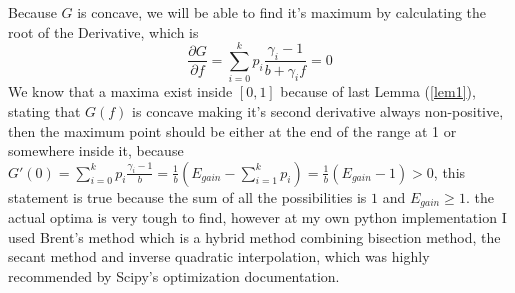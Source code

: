 \documentclass{article}
\newcommand{\pdiv}[2]{{\frac{\partial#1}{\partial#2}}}
\begin{document}
	Because $G$ is concave, we will be able to find it's maximum by calculating the root of the Derivative, which is 
	\[\pdiv{G}{f} = \sum_{i=0}^{k} p_i \frac{\gamma_i - 1}{b+\gamma_i f} = 0\] 
	We know that a maxima exist inside $[0,1]$ because of last Lemma (\ref{lem1}), stating that $G(f)$ is concave making it's second derivative always non-positive, then the maximum point should be either at the end of the range at 1 or somewhere inside it, because $G'(0) = \sum_{i=0}^{k} p_i \frac{\gamma_i - 1}{b} = \frac{1}{b}(E_{gain} - \sum_{i = 1}^{k} p_i) = \frac{1}{b}(E_{gain} - 1) > 0$, this statement is true because the sum of all the possibilities is $1$ and $E_{gain} \ge 1$.
	\newline
	the actual optima is very tough to find, however at my own python implementation I used Brent's method \cite{Scipy-brent} which is a hybrid method combining bisection method, the secant method and inverse quadratic interpolation, which was highly recommended by Scipy's optimization documentation.
	\newline
\end{document}
